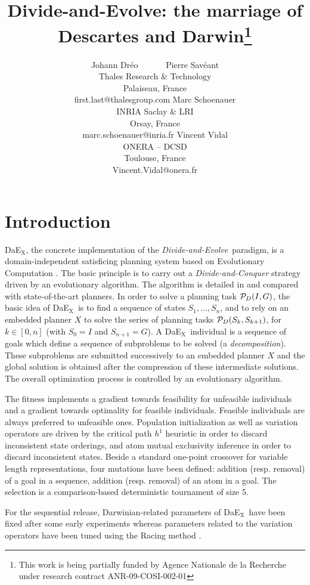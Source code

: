 \documentclass[letterpaper]{article}
\title{Divide-and-Evolve: the marriage of Descartes and Darwin\thanks{This work is being partially funded by Agence Nationale de la Recherche under research contract ANR-09-COSI-002-01}}
\author{Johann Dr{\'e}o \ \ \ \ \ \ Pierre Sav{\'e}ant\\Thales Research \& Technology\\Palaiseau, France\\first.last@thalesgroup.com
\And Marc Schoenauer\\INRIA Saclay \& LRI\\Orsay, France\\marc.schoenauer@inria.fr
\And Vincent Vidal\\ONERA -- DCSD\\ Toulouse, France \\ Vincent.Vidal@onera.fr}
\newcommand{\dae}{{\em Divide-and-Evolve}}
\newcommand{\DAEX}{{\sc DaE$_{\text{X}}$}}
\begin{document}
\maketitle

\begin{abstract}




\end{abstract}


\section{Introduction}
\DAEX,   the   concrete   implementation   of   the   \dae\   paradigm,   is   a
domain-independent satisficing planning system based on Evolutionary Computation
\cite{dae:evocop2006}.   The  basic  principle  is   to   carry   out   a   {\em
Divide-and-Conquer} strategy driven by an evolutionary algorithm. The algorithm
is detailed in \cite{dae:icaps2010} and compared with state-of-the-art planners.
In order to solve a planning task ${\cal P}_D(I,G)$, the basic idea of \DAEX\ is
to find a sequence of states $S_1, \ldots, S_n$, and  to  rely  on  an  embedded
planner $X$ to solve the series of planning tasks  ${\cal  P}_D(S_{k},S_{k+1})$,
for $k \in [0,n]$ (with $S_0 = I$ and $S_{n+1} = G$).  A \DAEX\ individual is  a
sequence of goals which define a sequence of subproblems to be  solved  (a  {\it
decomposition}).  These subproblems are submitted successively  to  an  embedded
planner $X$ and the global solution is obtained after the compression  of  these
intermediate solutions.  The  overall  optimization  process  is  controlled  by
an  evolutionary  algorithm.

The fitness implements a gradient towards feasibility for unfeasible individuals
and a gradient towards optimality for feasible individuals. Feasible individuals
are always preferred to unfeasible ones.  Population initialization as  well  as
variation  operators  are  driven  by  the   critical   path   $h^1$   heuristic
\cite{h1:aips2000} in order to discard inconsistent state  orderings,  and  atom
mutual exclusivity inference in order to discard inconsistent states.  Beside  a
standard one-point crossover for variable length representations, four mutations
have been defined: addition (resp.  removal) of a goal in a  sequence,  addition
(resp.  removal) of an atom in a goal.   The  selection  is  a  comparison-based
deterministic   tournament   of   size   5.

For the sequential release, Darwinian-related parameters of \DAEX\ have been
fixed after some early experiments \cite{dae:evocop2006} whereas parameters
related to the variation operators have been tuned using the Racing method
\cite{dae:gecco2010}.
\end{document}
